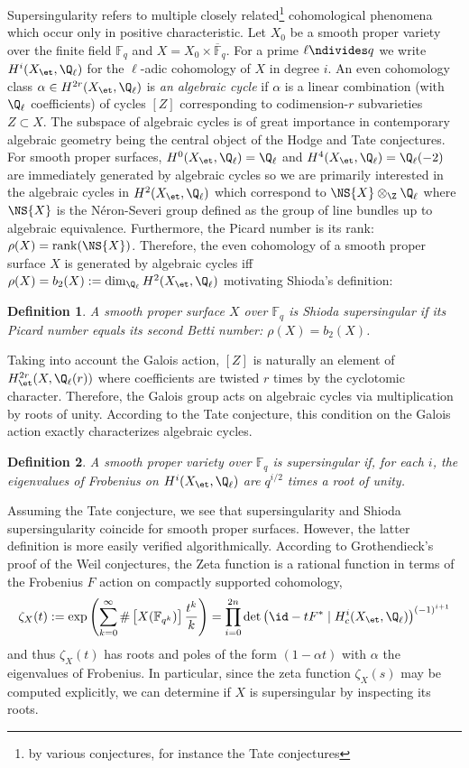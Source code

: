 \documentclass[12pt]{amsart}
\newtheorem*{defnn}{Definition}
\begin{document}
Supersingularity refers to multiple closely related\footnote{by various conjectures, for instance the Tate conjectures} cohomological phenomena which occur only in positive characteristic. Let $X_0$ be a smooth proper variety over the finite field $\mathbb{F}_q$ and $X = X_0 \times \overline{\mathbb{F}}_q$. For a prime $\ell \ndivides q$ we write $H^{i}(X_{\et}, \Q_\ell)$ for the $\ell$-adic \etale cohomology of $X$ in degree $i$. An even cohomology class $\alpha \in H^{2r}(X_{\et}, \Q_\ell)$ is \textit{an algebraic cycle} if $\alpha$ is a linear combination (with $\Q_\ell$ coefficients) of cycles $[Z]$ corresponding to codimension-$r$ subvarieties $Z \subset X$. The subspace of algebraic cycles is of great importance in contemporary algebraic geometry being the central object of the Hodge and Tate conjectures. For smooth proper surfaces, $H^0(X_{\et}, \Q_\ell) = \Q_\ell$ and $H^{4}(X_{\et}, \Q_\ell) = \Q_\ell(-2)$ are immediately generated by algebraic cycles so we are primarily interested in the algebraic cycles in $H^2(X_{\et}, \Q_\ell)$ which correspond to $\NS{X} \otimes_\Z \Q_\ell$ where $\NS{X}$ is the N\'{e}ron-Severi group defined as the group of line bundles up to algebraic equivalence. Furthermore, the Picard number is its rank: $\rho(X) = \mathrm{rank}(\NS{X})$. Therefore, the even cohomology of a smooth proper surface $X$ is generated by algebraic cycles iff $\rho(X) = b_2(X) := \dim_{\Q_\ell} H^2(X_{\et}, \Q_\ell)$ motivating Shioda's definition:

\begin{defnn}
A smooth proper surface $X$ over $\mathbb{F}_q$ is \textit{Shioda supersingular} if its Picard number equals its second Betti number: $\rho(X) = b_2(X)$.
\end{defnn} 
\noindent
Taking into account the Galois action, $[Z]$ is naturally an element of $H^{2r}_{\et}(X, \Q_\ell(r))$ where coefficients are twisted $r$ times by the cyclotomic character. Therefore, the Galois group acts on algebraic cycles via multiplication by roots of unity. According to the Tate conjecture, this condition on the Galois action exactly characterizes algebraic cycles.
\begin{defnn}
A smooth proper variety over $\mathbb{F}_q$ is \textit{supersingular} if, for each $i$, the eigenvalues of Frobenius on $H^{i}(X_{\et}, \Q_\ell)$ are $q^{i/2}$ times a root of unity.
\end{defnn}
\noindent
Assuming the Tate conjecture, we see that supersingularity and Shioda supersingularity coincide for smooth proper surfaces.
However, the latter definition is more easily verified algorithmically. According to Grothendieck's proof of the Weil conjectures, the Zeta function is a rational function in terms of the Frobenius $F$ action on compactly supported \etale cohomology,
\[ \zeta_X(t) := \exp{ \left( \sum_{k = 0}^\infty \# \left[ X(\mathbb{F}_{q^k}) \right] \frac{t^k}{k} \right)} = \prod_{i = 0}^{2n} \det{\left( \id - t F^* \mid H^{i}_c(X_{\et}, \Q_\ell) \right)}^{(-1)^{i + 1}} \]
and thus $\zeta_X(t)$ has roots and poles of the form $(1 - \alpha t)$ with $\alpha$ the eigenvalues of Frobenius. In particular, since the zeta function $\zeta_X(s)$ may be computed explicitly, we can determine if $X$ is supersingular by inspecting its roots.
\end{document}
